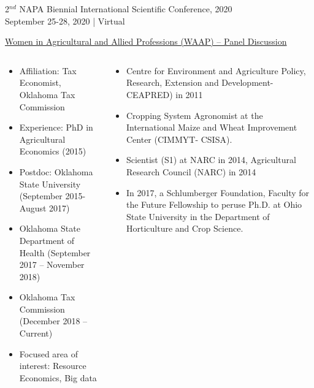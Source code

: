 \documentclass[dvipsnames,usenames]{beamer}
\begin{document}
\begin{frame}[plain,t]{\vskip2mm
2$^{nd}$ NAPA Biennial International Scientific Conference, 2020 \\[1cm]
September 25-28, 2020 | Virtual \\[1cm]}
\vspace{2cm}
\begin{block}

\begin{center}
\textcolor{panelredcolor}{{\fontsize{60pt}{skip=72}\selectfont \underline{Women in Agricultural and Allied Professions (WAAP) -- Panel Discussion}}} \\
\end{center}


\begin{columns}
\centering
\begin{column}{0.22\textwidth}
\begin{figure}
\centering
{}
\end{figure}
\begin{itemize}
\item Affiliation: Tax Economist, Oklahoma Tax Commission 
\item Experience: PhD in Agricultural Economics (2015) 
\item Postdoc: Oklahoma State University (September 2015- August 2017)
\item Oklahoma State Department of Health (September 2017 – November 2018)
\item Oklahoma Tax Commission (December 2018 – Current) 
\item Focused area of interest: Resource Economics, Big data
\end{itemize}
\end{column}

\begin{column}{0.22\textwidth}
\begin{figure}
    \centering
\end{figure}
\begin{itemize}
\item Centre for Environment and Agriculture Policy, Research, Extension and Development-CEAPRED) in 2011
\item Cropping System Agronomist at the International Maize and Wheat Improvement Center (CIMMYT- CSISA).
\item Scientist (S1) at NARC in 2014, Agricultural Research Council (NARC) in 2014
\item In 2017, a Schlumberger Foundation, Faculty for the Future Fellowship to peruse Ph.D. at Ohio State University in the Department of Horticulture and Crop Science.
\end{itemize}
\end{column}


\end{columns}
\end{block}
\end{frame}
\end{document}
